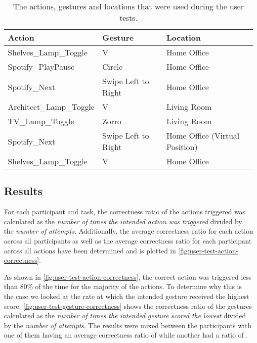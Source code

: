\begin{table}[]
\centering
\begin{tabular}{|l|l|l|}
\hline
\textbf{Action}                  & \textbf{Gesture}             & \textbf{Location}                       \\ \hline
Shelves\_Lamp\_Toggle   & V                   & Home Office                    \\ \hline
Spotify\_PlayPause      & Circle              & Home Office                    \\ \hline
Spotify\_Next           & Swipe Left to Right & Home Office                    \\ \hline
Architect\_Lamp\_Toggle & V                   & Living Room                    \\ \hline
TV\_Lamp\_Toggle        & Zorro               & Living Room                    \\ \hline
Spotify\_Next           & Swipe Left to Right & Home Office (Virtual Position) \\ \hline
Shelves\_Lamp\_Toggle   & V                   & Home Office                    \\ \hline
\end{tabular}
\caption{The actions, gestures and locations that were used during the user tests.}
\label{table:user-test-tasks}
\end{table}

\subsection{Results}
\label{sec:evaluation:user-tests-results}

For each participant and task, the correctness ratio of the actions triggered was calculated as the \emph{number of times the intended action was triggered} divided by
the \emph{number of attempts}.
Additionally, the average correctness ratio for each action across all participants as well as the average correctness ratio for each participant across
all actions have been determined and is plotted in \cref{fig:user-test-action-correctness}.

As shown in \cref{fig:user-test-action-correctness}, the correct action was triggered less than 80\% of the time for the majority of the actions.
To determine why this is the case we looked at the rate at which the intended gesture received the highest score.
\cref{fig:user-test-gesture-correctness} shows the correctness ratio of the gestures calculated as the \emph{number of times the intended gesture scored the lowest} divided by
the \emph{number of attempts}.
The results were mixed between the participants with one of them having an average correctness ratio of  while another had a ratio of .

